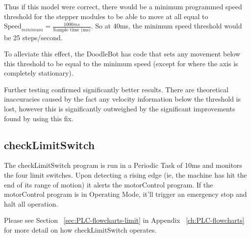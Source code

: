 			Thus if this model were correct, there would be a minimum programmed speed threshold for the stepper modules to be able to move at all equal to $\text{Speed}_{minimum} = \frac{1000ms}{\text{Sample time (ms)}}$. So at 40ms, the minimum speed threshold would be 25 steps/second.
			
			To alleviate this effect, the DoodleBot has code that sets any movement below this threshold to be equal to the minimum speed (except for where the axis is completely stationary). 
			
			Further testing confirmed significantly better results. There are theoretical inaccuracies caused by the fact any velocity information below the threshold is lost, however this is significantly outweighed by the significant improvements found by using this fix. 

\subsection{checkLimitSwitch}
	The checkLimitSwitch program is run in a Periodic Task of 10ms and monitors the four limit switches. Upon detecting a rising edge (ie, the machine has hit the end of its range of motion) it alerts the motorControl program. If the motorControl program is in Operating Mode, it'll trigger an emergency stop and halt all operation.
	
	Please see Section ~\ref{sec:PLC-flowcharts-limit} in Appendix ~\ref{ch:PLC-flowcharts} for more detail on how checkLimitSwitch operates.